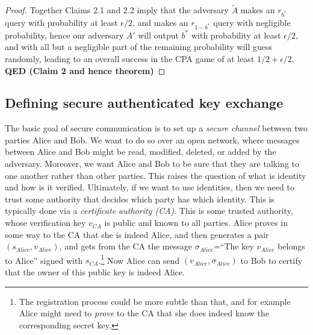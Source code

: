 \begin{proof}
Together Claims 2.1 and 2.2 imply that the adversary \(\tilde{A}\) makes
an \(r_{b^*}\) query with probability at least \(\epsilon/2\), and makes
an \(r_{1-b^*}\) query with negligible probability, hence our adversary
\(A'\) will output \(b^*\) with probability at least \(\epsilon/2\), and
with all but a negligible part of the remaining probability will guess
randomly, leading to an overall success in the CPA game of at least
\(1/2 + \epsilon/2\). \textbf{QED (Claim 2 and hence theorem)}

\end{proof}

\subsection{Defining secure authenticated key
exchange}\label{12-Defining-secure-authen}

The basic goal of secure communication is to set up a \emph{secure
channel} between two parties Alice and Bob. We want to do so over an
open network, where messages between Alice and Bob might be read,
modified, deleted, or added by the adversary. Moreover, we want Alice
and Bob to be sure that they are talking to one another rather than
other parties. This raises the question of what is identity and how is
it verified. Ultimately, if we want to use identities, then we need to
trust some authority that decides which party has which identity. This
is typically done via a \emph{certificate authority (CA)}. This is some
trusted authority, whose verification key \(v_{CA}\) is public and known
to all parties. Alice proves in some way to the CA that she is indeed
Alice, and then generates a pair \((s_{Alice},v_{Alice})\), and gets
from the CA the message \(\sigma_{Alice}\)=``The key \(v_{Alice}\)
belongs to Alice'' signed with \(s_{CA}\).\footnote{The registration
  process could be more subtle than that, and for example Alice might
  need to \emph{prove} to the CA that she does indeed know the
  corresponding secret key.} Now Alice can send
\((v_{Alice},\sigma_{Alice})\) to Bob to certify that the owner of this
public key is indeed Alice.

